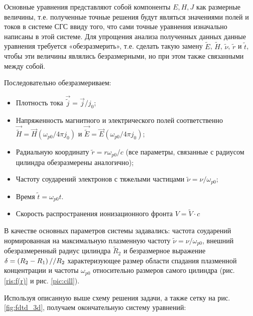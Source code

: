 \documentclass[a4paper]{article}
\begin{document}
Основные уравнения представляют собой компоненты $E, H, J$ как размерные величины, т.е. полученные точные решения будут являться значениями полей и токов в системе СГС ввиду того, что сами точные уравнения изначально написаны в этой системе. Для упрощения анализа полученных данных данные уравнения требуется «обезразмерить», т.е. сделать такую замену $\tilde{E}$, $\tilde{H}$, $\tilde{\nu}$, $\tilde{r}$ и $\tilde{t}$, чтобы эти величины являлись безразмерными, но при этом также связанными между собой.

Последовательно обезразмериваем:
\begin{itemize}
	\item Плотность тока $\vec{\widetilde{j}}=\vec{j}/j_{0}$;	
	\item Напряженность магнитного и электрического полей соответственно\\ $\vec{\widetilde{H}}=\vec{H}\left(\omega_{p0}/4\pi j_{0}\right)$ и $\vec{\widetilde{E}}=\vec{E}\left(\omega_{p0}/4\pi j_{0}\right)$;	
	\item Радиальную координату $\widetilde{r}=r\omega_{p0}/c$ (все параметры, связанные с радиусом цилиндра обезразмерены аналогично);	
	\item Частоту соударений электронов с тяжелыми частицами $\widetilde{\nu}=\nu/\omega_{p0}$;	
	\item Время $\tilde{t}=\omega_{p0} t$.	
	\item Скорость распространения ионизационного фронта $V = \tilde{V}\cdot c$
\end{itemize}

В качестве основных параметров системы задавались:  частота соударений нормированная на максимальную плазменную частоту $\tilde{\nu}=\nu/\omega_{p 0}$, внешний обезразмеренный радиус цилиндра $\tilde{R}_{2}$ и безразмерное выражение $\delta=\left(R_{2}-R_{1}\right)/\\/R_{2}$ характеризующее размер области спадания плазменной концентрации и частоты $\omega_{p 0}$ относительно размеров самого цилиндра (рис. \ref{ris:f(r)} и рис. \ref{pic:cill}).

Используя описанную выше схему решения задачи, а также сетку на рис. \ref{fig:fdtd_3d}, получаем окончательную систему уравнений:
\end{document}
